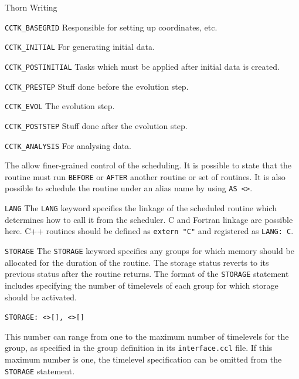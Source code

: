 \begin{cactuspart}{Thorn Writing}
\begin{Lentry}
\item [\texttt{CCTK\_BASEGRID}]
Responsible for setting up coordinates, etc.

\item [\texttt{CCTK\_INITIAL}]
For generating initial data.

\item [\texttt{CCTK\_POSTINITIAL}]
Tasks which must be applied after initial data is created.

\item [\texttt{CCTK\_PRESTEP}]
Stuff done before the evolution step.

\item [\texttt{CCTK\_EVOL}]
The evolution step.

\item [\texttt{CCTK\_POSTSTEP}]
Stuff done after the evolution step.

\item [\texttt{CCTK\_ANALYSIS}]
For analysing data.

\end{Lentry}

The  allow finer-grained control of the scheduling.  It is
possible to state that the routine must run \texttt{BEFORE} or \texttt{AFTER}
another routine or set of routines.
It is also possible to schedule the routine under an
alias name by using \texttt{AS <>}.

\begin{Lentry}

\item[\texttt{LANG}]
The \texttt{LANG} keyword specifies the linkage of the scheduled routine
which determines how to call it from the scheduler.
C and Fortran linkage are possible here. C++ routines should be defined as
\texttt{extern "C"} and registered as \texttt{LANG: C}.

\item[\texttt{STORAGE}] The \texttt{STORAGE} keyword specifies any groups for
which memory should be allocated for the duration of the routine.  The
storage status reverts to its previous status after the routine
returns. The format of the \texttt{STORAGE} statement includes specifying
the number of timelevels of each group for which storage should be activated.

\texttt{STORAGE: <>[],
<>[]}

 This number can range from one to the maximum number of timelevels for the group, as specified in the group definition in its \texttt{interface.ccl} file. If this maximum number is one, the timelevel specification can be omitted from the
\texttt{STORAGE} statement.


\end{Lentry}
\end{cactuspart}
